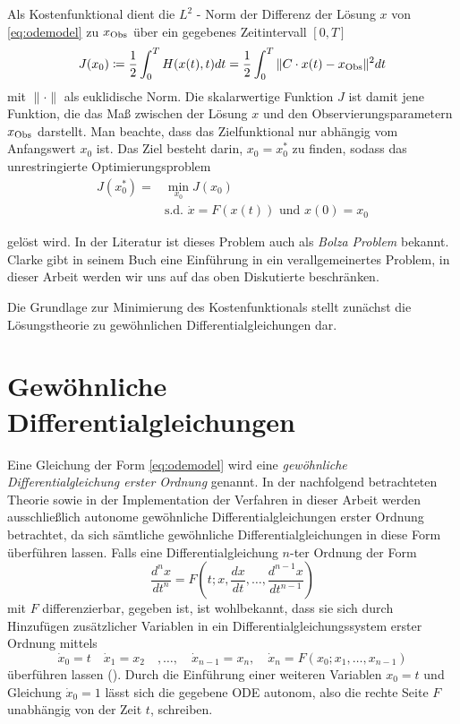 Als Kostenfunktional dient die $L^2$ - Norm der Differenz der Lösung $x$ von \eqref{eq:odemodel} zu $x_{\text{Obs}}$ über ein gegebenes Zeitintervall $[0,T]$
\begin{equation}
\label{eq:costfunctional}
J(x_0) \coloneqq \frac{1}{2}\int_0^T H(x(t),t)dt = \frac{1}{2}\int_0^T \|C\cdot x(t)-x_{\text{Obs}}\|^2dt
\end{equation}
mit $\|\cdot \|$ als euklidische Norm. Die skalarwertige Funktion $J$ ist damit jene Funktion, die das Maß zwischen der Lösung $x$ und den Observierungsparametern $x_{\text{Obs}}$ darstellt.
Man beachte, dass das Zielfunktional nur abhängig vom Anfangswert $x_0$ ist. Das Ziel besteht darin, $x_0 = x_0^*$ zu finden, sodass das unrestringierte Optimierungsproblem
\begin{equation}
\label{eq:bolzaProblem}
\begin{aligned}
 J(x_0^*) =& \min_{x_0} J(x_0) \\
 &\text{s.d. } \dot x = F(x(t)) \text{ und } x(0) = x_0
\end{aligned}
\end{equation}

gelöst wird. 
In der Literatur ist dieses Problem auch als \textit{Bolza Problem} bekannt. Clarke gibt in seinem Buch \cite[S. 165 ff]{clarke1990optimization} eine Einführung in ein verallgemeinertes Problem, in dieser Arbeit werden wir uns auf das oben Diskutierte beschränken.

Die Grundlage zur Minimierung des Kostenfunktionals stellt zunächst die Lösungstheorie zu gewöhnlichen Differentialgleichungen dar.

\section{Gewöhnliche Differentialgleichungen}
Eine Gleichung der Form \eqref{eq:odemodel} wird eine \textit{gewöhnliche Differentialgleichung erster Ordnung} genannt. 
In der nachfolgend betrachteten Theorie sowie in der Implementation der Verfahren in dieser Arbeit werden ausschließlich autonome gewöhnliche Differentialgleichungen erster Ordnung betrachtet, da sich sämtliche gewöhnliche Differentialgleichungen in diese Form überführen lassen.
Falls eine Differentialgleichung $n$-ter Ordnung der Form 
\[
 \frac{d^n x}{dt^n}= F\left(t;x,\frac{dx}{dt},\ldots,\frac{d^{n-1} x}{dt^{n-1}}\right)
\]
mit $F$ differenzierbar, gegeben ist, ist wohlbekannt, dass sie sich durch Hinzufügen zusätzlicher Variablen in ein Differentialgleichungssystem erster Ordnung mittels
\[
 \dot x_0=t\quad \dot x_1 = x_2 \quad ,\ldots,\quad \dot x_{n-1} = x_n, \quad  \dot x_n = F(x_0;x_1,\ldots,x_{n-1})
\]
überführen lassen (\cite[S. 105]{arnold2001grundbegriffe}).
Durch die Einführung einer weiteren Variablen $x_0 = t$ und Gleichung $\dot x_0=1$ lässt sich die gegebene ODE autonom, also die rechte Seite $F$ unabhängig von der Zeit $t$, schreiben.
